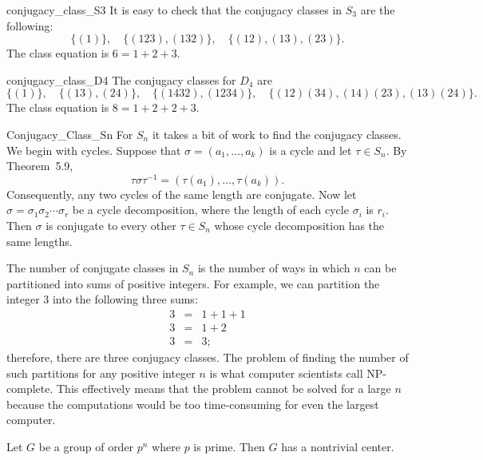  
\begin{example}{conjugacy_class_S3}
It is easy to check that  the conjugacy classes in $S_3$ are the
following: 
\[
\{ (1) \},  \quad \{ (123), (132) \}, \quad \{(12), (13), (23) \}.
\]
The class equation is $6 = 1+2+3$.
\end{example}
 
 
\begin{example}{conjugacy_class_D4}
The conjugacy classes for $D_4$ are
\[
\{ (1) \}, \quad
\{ (13), (24) \}, \quad
\{ (1432), (1234) \}, \quad
\{ (12)(34), (14)(23), (13)(24) \}.
\]
The class equation is $8 = 1 + 2 + 2 + 3$.
\end{example}
 
 
\begin{example}{Conjugacy_Class_Sn}
For $S_n$ it takes a bit of work to find the conjugacy classes.  We
begin with cycles.  Suppose that $\sigma = ( a_1, \ldots, a_k)$ is a
cycle and let $\tau \in S_n$. By Theorem~5.9,
\[
\tau \sigma \tau^{-1} = ( \tau( a_1), \ldots, \tau(a_k)).
\]
Consequently, any two cycles of the same length are conjugate. Now let
$\sigma = \sigma_1 \sigma_2 \cdots \sigma_r$ be a cycle decomposition,
where the length of each cycle $\sigma_i$ is $r_i$. Then $\sigma$ is
conjugate to every other $\tau \in S_n$ whose cycle decomposition has
the same lengths. 
 
 
The number of conjugate classes in $S_n$ is the number of ways in
which $n$ can be partitioned into sums of positive integers. For
example, we can partition the integer 3 into the following three sums: 
\begin{eqnarray*}
3 & = & 1 + 1 + 1 \\
3 & = & 1 + 2 \\
3 & = & 3;
\end{eqnarray*}
therefore, there are three conjugacy classes. The problem of finding
the number of such partitions for any positive integer $n$ is what
computer scientists call {\bfi NP-complete}.  This effectively means
that the problem cannot be solved for a large $n$ because the
computations would be too time-consuming for even the largest computer. 
\end{example}
 
 

 
 
\begin{theorem}\label{pn_theorem}
Let $G$ be a group of order $p^n$ where $p$ is prime. Then $G$ has a
nontrivial center. 
\end{theorem}
 
